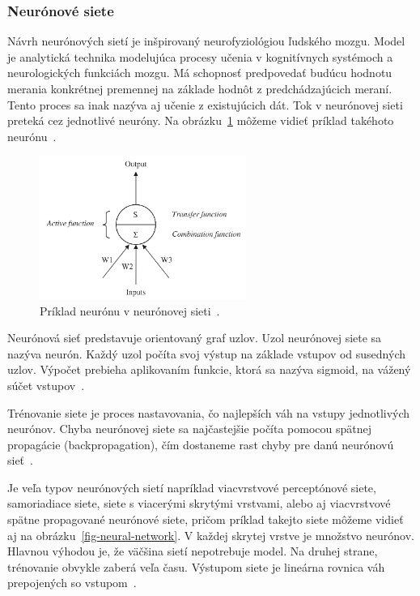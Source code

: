 \documentclass[a4paper,slovak,12pt,appendix]{article}
\begin{document}

\subsubsection{Neurónové siete}
Návrh neurónových sietí je inšpirovaný neurofyziológiou ľudského mozgu. Model
je analytická technika modelujúca procesy učenia v kognitívnych systémoch
a neurologických funkciách mozgu. Má schopnosť predpovedať budúcu hodnotu
merania konkrétnej premennej na základe hodnôt z predchádzajúcich meraní. Tento
proces sa inak nazýva aj učenie z existujúcich dát. Tok v neurónovej sieti
preteká cez jednotlivé neuróny. Na obrázku~\ref{fig-neuron} môžeme vidieť
príklad takéhoto neurónu~\cite{Tso2007}.

\begin{figure}[!ht]
  \centering
  \includegraphics[width=0.6\textwidth]{neuron.png}
  \caption{Príklad neurónu v neurónovej sieti~\cite{Tso2007}.}
  \label{fig-neuron}
\end{figure}

Neurónová sieť predstavuje orientovaný graf uzlov. Uzol neurónovej
siete sa nazýva neurón. Každý uzol počíta svoj výstup na základe vstupov od
susedných uzlov. Výpočet prebieha aplikovaním funkcie, ktorá sa nazýva sigmoid,
na vážený súčet vstupov~\cite{Gruau1994}.

Trénovanie siete je proces nastavovania, čo najlepších váh na vstupy
jednotlivých neurónov. Chyba neurónovej siete sa najčastejšie počíta pomocou
spätnej propagácie (backpropagation), čím dostaneme rast chyby pre danú
neurónovú sieť~\cite{Tso2007}.

Je veľa typov neurónových sietí napríklad viacvrstvové perceptónové siete,
samoriadiace siete, siete s viacerými skrytými vrstvami, alebo aj viacvrstvové
spätne propagované neurónové siete, pričom príklad takejto siete môžeme vidieť
aj na obrázku~\ref{fig-neural-network}. V každej skrytej vrstve je množstvo
neurónov. Hlavnou výhodou je, že väčšina sietí nepotrebuje model. Na druhej strane,
trénovanie obvykle zaberá veľa času. Výstupom siete je lineárna rovnica váh
prepojených so vstupom~\cite{KumarSingh2013}.
\end{document}
